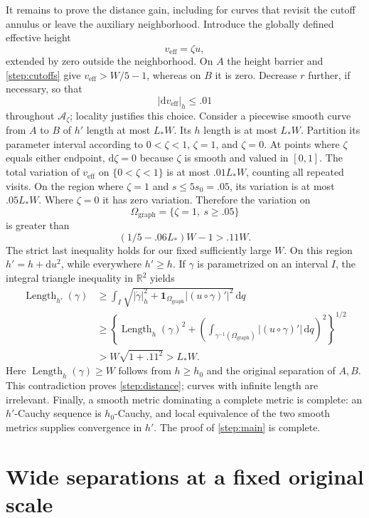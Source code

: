 \documentclass[11pt]{article}
\numberwithin{equation}{section}
\theoremstyle{definition}
\theoremstyle{remark}
\begin{document}
It remains to prove the distance gain, including for curves that revisit
the cutoff annulus or leave the auxiliary neighborhood.  Introduce the
globally defined effective height
\[
 v_{\mathrm{eff}}=\zeta u,
\]
extended by zero outside the neighborhood.  On $A$ the height barrier
and \cref{step:cutoffs} give $v_{\mathrm{eff}}>W/5-1$, whereas on $B$
it is zero.  Decrease $r$ further, if necessary, so that
\begin{equation}\label{step:height-cutoff}
 |\mathrm d v_{\mathrm{eff}}|_h\le .01
\end{equation}
throughout $\mathcal A_\zeta$; locality justifies this choice.
Consider a piecewise smooth curve from $A$ to $B$ of $h'$ length at most
$L_*W$.  Its $h$ length is at most $L_*W$.  Partition its parameter interval according to $0<\zeta<1$,
$\zeta=1$, and $\zeta=0$. At points where $\zeta$ equals either endpoint,
$\mathrm d\zeta=0$ because $\zeta$ is smooth and valued in $[0,1]$.
The total variation of
$v_{\mathrm{eff}}$ on $\{0<\zeta<1\}$ is at most $.01L_*W$,
counting all repeated visits.  On the region where $\zeta=1$ and
$s\le5s_0=.05$, its variation is at most $.05L_*W$.  Where $\zeta=0$
it has zero variation.  Therefore the variation on
\[
 \Omega_{\mathrm{graph}}=\{\zeta=1,\ s\ge .05\}
\]
is greater than
\[
 (1/5-.06L_*)W-1>.11W.
\]
The strict last inequality holds for our fixed sufficiently large $W$.
On this region $h'=h+\mathrm d u^2$, while everywhere $h'\ge h$.
If $\gamma$ is parametrized on an interval $I$, the integral triangle
inequality in $\mathbb R^2$ yields
\begin{align*}
 \operatorname{Length}_{h'}(\gamma)
 &\ge\int_I\sqrt{|\dot\gamma|_h^2+
      \mathbf1_{\Omega_{\mathrm{graph}}}|(u\circ\gamma)'|^2}
       \,\mathrm d q\\
 &\ge\left\{
   \operatorname{Length}_h(\gamma)^2+
   \left(\int_{\gamma^{-1}(\Omega_{\mathrm{graph}})}
     |(u\circ\gamma)'|\,\mathrm d q\right)^2
   \right\}^{1/2}\\
 &>W\sqrt{1+.11^2}>L_*W.
\end{align*}
Here $\operatorname{Length}_h(\gamma)\ge W$ follows from $h\ge h_0$
and the original separation of $A,B$.  This contradiction proves
\cref{step:distance}; curves with infinite length are irrelevant.
Finally, a smooth metric dominating a complete metric is complete:
an $h'$-Cauchy sequence is $h_0$-Cauchy, and local equivalence of the
two smooth metrics supplies convergence in $h'$.  The proof of
\cref{step:main} is complete.

\section{Wide separations at a fixed original scale}\label{sec:rounds}
\end{document}
